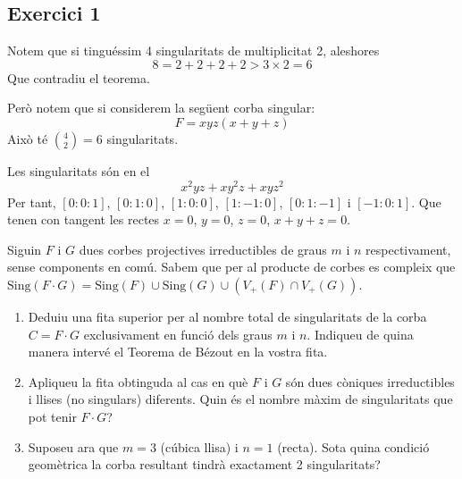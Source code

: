\documentclass[11pt, a4paper]{article}
\begin{document}
\subsection{Exercici 1}
Notem que si tinguéssim 4 singularitats de multiplicitat 2, aleshores
\[
    8=2+2+2+2>3\times 2=6
\]
Que contradiu el teorema.\par\vspace{5mm}
Però notem que si considerem la següent corba singular:
\[
    F=xyz(x+y+z)
\]
Això té ${4\choose 2}=6$ singularitats.\par
Les singularitats són en el 
\[
x^2yz+xy^2z+xyz^2
\]
Per tant, $[0:0:1]$, $[0:1:0]$, $[1:0:0]$, $[1:-1:0]$, $[0:1:-1]$ i $[-1:0:1]$. Que tenen con tangent les rectes $x=0$, $y=0$, $z=0$, $x+y+z=0$.
\newpage
\begin{tcolorbox}[title=\section{Exercici 2}]
Siguin $F$ i $G$ dues corbes projectives irreductibles de graus $m$ i $n$ respectivament, sense components en comú. Sabem que per al producte de corbes es compleix que $\text{Sing}(F \cdot G) = \text{Sing}(F) \cup \text{Sing}(G) \cup (V_+(F) \cap V_+(G))$.
\begin{enumerate}
    \item Deduiu una fita superior per al nombre total de singularitats de la corba $C = F \cdot G$ exclusivament en funció dels graus $m$ i $n$. Indiqueu de quina manera intervé el Teorema de Bézout en la vostra fita.
    \item Apliqueu la fita obtinguda al cas en què $F$ i $G$ són dues còniques irreductibles i llises (no singulars) diferents. Quin és el nombre màxim de singularitats que pot tenir $F \cdot G$?
    \item Suposeu ara que $m=3$ (cúbica llisa) i $n=1$ (recta). Sota quina condició geomètrica la corba resultant tindrà exactament 2 singularitats?
\end{enumerate}
\end{tcolorbox}
\end{document}
